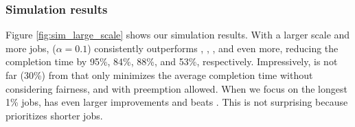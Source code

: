 


\subsubsection{Simulation results}
\label{sec:large-sim}


Figure \ref{fig:sim_large_scale} shows our simulation results. With a larger scale and more jobs, \name ($\alpha = 0.1$) consistently outperforms \DRFFIFO, \DRFSJF, \ESRP, and \DRFExt even more, reducing the completion time by 95\%, 84\%, 88\%, and 53\%, respectively.
Impressively, \name is not far (30\%) from \SRPT that only minimizes the average completion time without considering fairness, and with preemption allowed. 
When we focus on the longest 1\% jobs, \name has even larger improvements and beats \SRPT. This is not surprising because \SRPT prioritizes shorter jobs. 


